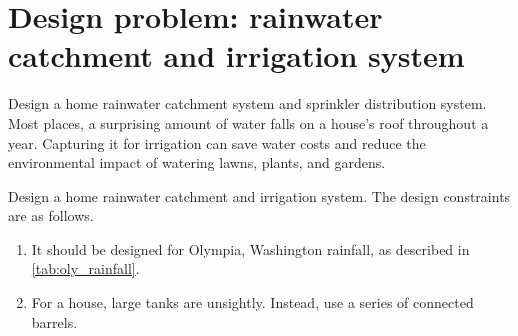 \documentclass[dynamic_systems.tex]{subfiles}
\begin{document}
\section[Design problem]{Design problem: rainwater catchment and irrigation system}
\tags{}

Design a home rainwater catchment system and sprinkler distribution system.
Most places, a surprising amount of water falls on a house's roof throughout a year.
Capturing it for irrigation can save water costs and reduce the environmental impact of watering lawns, plants, and gardens.
\tags{}

Design a home rainwater catchment and irrigation system.
The design constraints are as follows.
\tags{}
\begin{enumerate}
  \item It should be designed for Olympia, Washington rainfall, as described in \autoref{tab:oly_rainfall}.
  \item For a house, large tanks are unsightly. Instead, use a series of connected barrels.
\end{enumerate}
\end{document}
